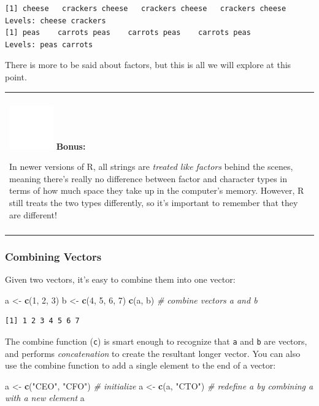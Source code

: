\documentclass[
]{book}
\newenvironment{Shaded}{\begin{snugshade}}{\end{snugshade}}
\newcommand{\CommentTok}[1]{\textcolor[rgb]{0.56,0.35,0.01}{\textit{#1}}}
\newcommand{\DecValTok}[1]{\textcolor[rgb]{0.00,0.00,0.81}{#1}}
\newcommand{\KeywordTok}[1]{\textcolor[rgb]{0.13,0.29,0.53}{\textbf{#1}}}
\newcommand{\NormalTok}[1]{#1}
\newcommand{\StringTok}[1]{\textcolor[rgb]{0.31,0.60,0.02}{#1}}
\newenvironment{bonus}
{
  \begin{center}
  \begin{tabular}{|>{\columncolor{bonus}\color{white}}p{0.9\textwidth}|}\hline\\
  \includegraphics[scale=0.1]{src/images/sun-fill-invert.png}
  \textbf{Bonus:}
}
{\\\\\hline
  \end{tabular}
  \end{center}
}
\begin{document}
\begin{verbatim}
[1] cheese   crackers cheese   crackers cheese   crackers cheese  
Levels: cheese crackers
[1] peas    carrots peas    carrots peas    carrots peas   
Levels: peas carrots
\end{verbatim}

There is more to be said about factors, but this is all we will explore at this point.

\begin{bonus}
In newer versions of R, all strings are \emph{treated like factors}
behind the scenes, meaning there's really no difference between factor
and character types in terms of how much space they take up in the
computer's memory. However, R still treats the two types differently, so
it's important to remember that they are different!
\end{bonus}

\hypertarget{combining-vectors}{%
\subsubsection{Combining Vectors}\label{combining-vectors}}

Given two vectors, it's easy to combine them into one vector:

\begin{Shaded}
\begin{Highlighting}[]
\NormalTok{a <-}\StringTok{ }\KeywordTok{c}\NormalTok{(}\DecValTok{1}\NormalTok{, }\DecValTok{2}\NormalTok{, }\DecValTok{3}\NormalTok{)}
\NormalTok{b <-}\StringTok{ }\KeywordTok{c}\NormalTok{(}\DecValTok{4}\NormalTok{, }\DecValTok{5}\NormalTok{, }\DecValTok{6}\NormalTok{, }\DecValTok{7}\NormalTok{)}
\KeywordTok{c}\NormalTok{(a, b)   }\CommentTok{# combine vectors a and b}
\end{Highlighting}
\end{Shaded}

\begin{verbatim}
[1] 1 2 3 4 5 6 7
\end{verbatim}

The combine function (\texttt{c}) is smart enough to recognize that \texttt{a} and \texttt{b} are vectors, and performs \emph{concatenation} to create the resultant longer vector.
You can also use the combine function to add a single element to the end of a vector:

\begin{Shaded}
\begin{Highlighting}[]
\NormalTok{a <-}\StringTok{ }\KeywordTok{c}\NormalTok{(}\StringTok{"CEO"}\NormalTok{, }\StringTok{"CFO"}\NormalTok{)   }\CommentTok{# initialize }
\NormalTok{a <-}\StringTok{ }\KeywordTok{c}\NormalTok{(a, }\StringTok{"CTO"}\NormalTok{)       }\CommentTok{# redefine a by combining a with a new element}
\NormalTok{a}
\end{Highlighting}
\end{Shaded}
\end{document}
